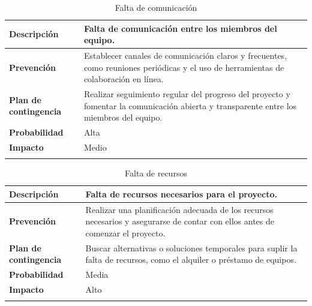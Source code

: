 \documentclass{report}
\begin{document}
        \begin{center}
            \begin{longtable}{|p{6cm}|p{6cm}|}
                \hline
                \textbf{Descripción} & Falta de comunicación entre los miembros del equipo.\\
                \hline
                \textbf{Prevención} & Establecer canales de comunicación claros y frecuentes, como reuniones periódicas y el uso de herramientas de colaboración en línea.\\
                \hline
                \textbf{Plan de contingencia} & Realizar seguimiento regular del progreso del proyecto y fomentar la comunicación abierta y transparente entre los miembros del equipo.\\
                \hline
                \textbf{Probabilidad} & Alta\\
                \hline
                \textbf{Impacto} & Medio\\
                \hline
                \caption{Falta de comunicación}
            \end{longtable}
        \end{center}
        \begin{center}
            \begin{longtable}{|p{6cm}|p{6cm}|}
                \hline
                \textbf{Descripción} & Falta de recursos necesarios para el proyecto.\\
                \hline
                \textbf{Prevención} & Realizar una planificación adecuada de los recursos necesarios y asegurarse de contar con ellos antes de comenzar el proyecto.\\
                \hline
                \textbf{Plan de contingencia} & Buscar alternativas o soluciones temporales para suplir la falta de recursos, como el alquiler o préstamo de equipos.\\
                \hline
                \textbf{Probabilidad} & Media\\
                \hline
                \textbf{Impacto} & Alto\\
                \hline
                \caption{Falta de recursos}
            \end{longtable}
        \end{center}
        \clearpage
\end{document}

